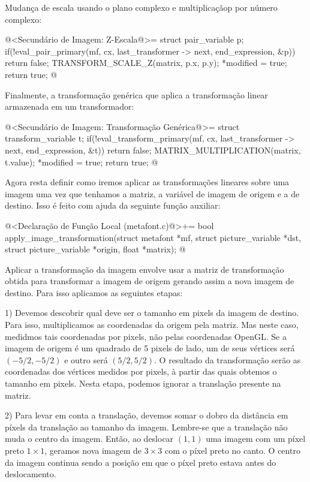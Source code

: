{Mudança de escala usando o plano complexo e multiplicaçãop por número
complexo:

\iniciocodigo
@<Secundário de Imagem: Z-Escala@>=
struct pair_variable p;
if(!eval_pair_primary(mf, cx, last_transformer -> next, end_expression, &p))
  return false;
TRANSFORM_SCALE_Z(matrix, p.x, p.y);
*modified = true;
return true;
@
\fimcodigo

Finalmente, a transformação genérica que aplica a transformação linear
armazenada em um transformador:

\iniciocodigo
@<Secundário de Imagem: Transformação Genérica@>=
struct transform_variable t;
if(!eval_transform_primary(mf, cx, last_transformer -> next, end_expression,
                           &t))
  return false;
MATRIX_MULTIPLICATION(matrix, t.value);
*modified = true;
return true;
@
\fimcodigo

Agora resta definir como iremos aplicar as transformações lineares
sobre uma imagem uma vez que tenhamos a matriz, a variável de imagem
de origem e a de destino. Isso é feito com ajuda da seguinte função
auxiliar:

\iniciocodigo
@<Declaração de Função Local (metafont.c)@>+=
bool apply_image_transformation(struct metafont *mf,
                                struct picture_variable *dst,
                                struct picture_variable *origin,
                                float *matrix);
@
\fimcodigo

Aplicar a transformação da imagem envolve usar a matriz de
transformação obtida para transformar a imagem de origem gerando assim
a nova imagem de destino. Para isso aplicamos as seguintes etapas:

1) Devemos descobrir qual deve ser o tamanho em pixels da imagem de
destino. Para isso, multiplicamos as coordenadas da origem pela
matriz. Mas neste caso, medidmos tais coordenadas por pixels, não
pelas coordenadas OpenGL. Se a imagem de origem é um quadrado de 5
pixels de lado, um de seus vértices será $(-5/2, -5/2)$ e outro será
$(5/2, 5/2)$. O resultado da transformação serão as coordenadas dos
vértices medidos por pixels, à partir das quais obtemos o tamanho em
pixels. Nesta etapa, podemos ignorar a translação presente na matriz.

2) Para levar em conta a translação, devemos somar o dobro da
distância em píxels da translação ao tamanho da imagem. Lembre-se que a
translação não muda o centro da imagem. Então, ao deslocar $(1, 1)$
uma imagem com um píxel preto $1\times 1$, geramos nova imagem de
$3\times 3$ com o píxel preto no canto. O centro da imagem continua
sendo a posição em que o píxel preto estava antes do deslocamento.

}

